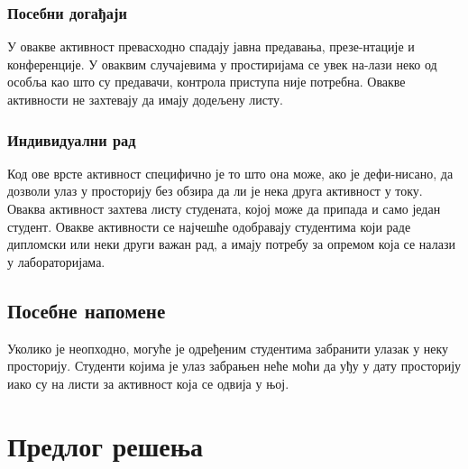 \documentclass[a4paper, 12pt, diplomski]{etfcyr}
\begin{document}
			\newpage

			\subsection[Сценарио 4]{Посебни догађаји}
				\begin{justify}
					У овакве активност превасходно спадају јавна предавања, презе-нтације и конференције. У оваквим случајевима у простиријама се увек на-лази неко од особља као што су предавачи, контрола приступа није потребна. Овакве активности не захтевају да имају додељену листу.
				\end{justify}

			\subsection[Сценарио 5]{Индивидуални рад}
				\begin{justify}
					Код ове врсте активност специфично је то што она може, ако је дефи-нисано, да дозволи улаз у просторију без обзира да ли је нека друга активност у току. Оваква активност захтева листу студената, којој може да припада и само један студент. Овакве активности се најчешће одобравају студентима који раде дипломски или неки други важан рад, а имају потребу за опремом која се налази у лабораторијама.
				\end{justify}

		\section{Посебне напомене}
			\begin{justify}
				Уколико је неопходно, могуће је одређеним студентима забранити улазак у неку просторију. Студенти којима је улаз забрањен неће моћи да уђу у дату просторију иако су на листи за активност која се одвија у њој.
			\end{justify}

	\chapter{Предлог решења}
\end{document}

